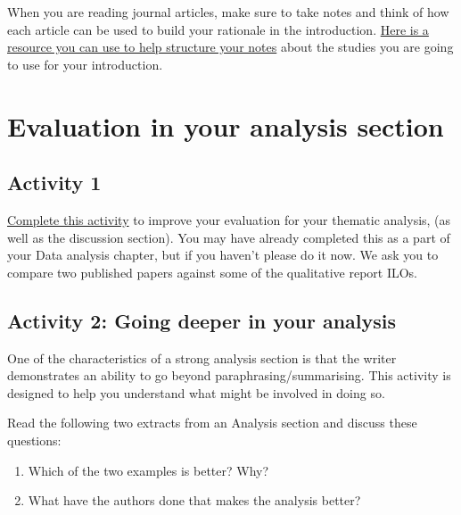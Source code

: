 \documentclass[
  english,
  letterpaper,
  DIV=11,
  numbers=noendperiod]{scrreprt}
\providecommand{\tightlist}{%
  \setlength{\itemsep}{0pt}\setlength{\parskip}{0pt}}
\begin{document}
When you are reading journal articles, make sure to take notes and think
of how each article can be used to build your rationale in the
introduction.
\href{https://gla-my.sharepoint.com/:w:/g/personal/wilhelmiina_toivo_glasgow_ac_uk/EXPNU5j4pQhKvRMYVx8dBvcBs85f4Z8q1V21wSokGOIbCA?e=eg7zd0}{Here
is a resource you can use to help structure your notes} about the
studies you are going to use for your introduction.

\section{Evaluation in your analysis section}\label{eval_analysis}

\subsection{Activity 1}\label{activity-1-1}

\href{https://gla-my.sharepoint.com/:w:/g/personal/ashley_robertson_glasgow_ac_uk/EUiKwKgdqr1CsLeOxy5O42kBGNLxmbdeTqANFRu0caPcBA?e=BpEpBb}{Complete
this activity} to improve your evaluation for your thematic analysis,
(as well as the discussion section). You may have already completed this
as a part of your Data analysis chapter, but if you haven't please do it
now. We ask you to compare two published papers against some of the
qualitative report ILOs.

\subsection{Activity 2: Going deeper in your
analysis}\label{activity-2-going-deeper-in-your-analysis}

One of the characteristics of a strong analysis section is that the
writer demonstrates an ability to go beyond paraphrasing/summarising.
This activity is designed to help you understand what might be involved
in doing so.

Read the following two extracts from an Analysis section and discuss
these questions:

\begin{enumerate}
\def\labelenumi{\arabic{enumi}.}
\tightlist
\item
  Which of the two examples is better? Why?
\item
  What have the authors done that makes the analysis better?
\end{enumerate}
\end{document}
